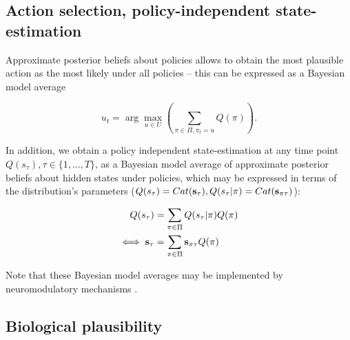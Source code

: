 \documentclass[review,12pt,authoryear]{elsarticle}
\begin{document}
\subsection{Action selection, policy-independent state-estimation}

Approximate posterior beliefs about policies allows to obtain the most plausible action as the most likely under all policies -- this can be expressed as a Bayesian model average

\begin{equation}
\label{eq: action selection}
    u_t = \arg \max_{u \in U } \left (\sum_{\pi \in \Pi , \pi_t =u} Q(\pi)\right).
\end{equation}

In addition, we obtain a policy independent state-estimation at any time point $Q(s_\tau),\tau \in \{1,...,T\}$, as a Bayesian model average of approximate posterior beliefs about hidden states under policies, which may be expressed in terms of the distribution's parameters ($Q(s_\tau)= Cat(\bold s_\tau),Q(s_\tau |\pi)= Cat(\bold s_{\pi\tau})$):

\begin{equation}
\label{eq: policy indep}
    \begin{split}
        Q(s_\tau) &= \sum_{\pi \in \Pi} Q(s_\tau |\pi)Q(\pi)\\
        \iff \bold s_\tau &= \sum_{\pi \in \Pi} \bold s_{\pi\tau} Q(\pi)
    \end{split}
\end{equation}

Note that these Bayesian model averages may be implemented by neuromodulatory mechanisms \citep{fitzgeraldModelAveragingOptimal2014}.

\subsection{Biological plausibility}
\end{document}
